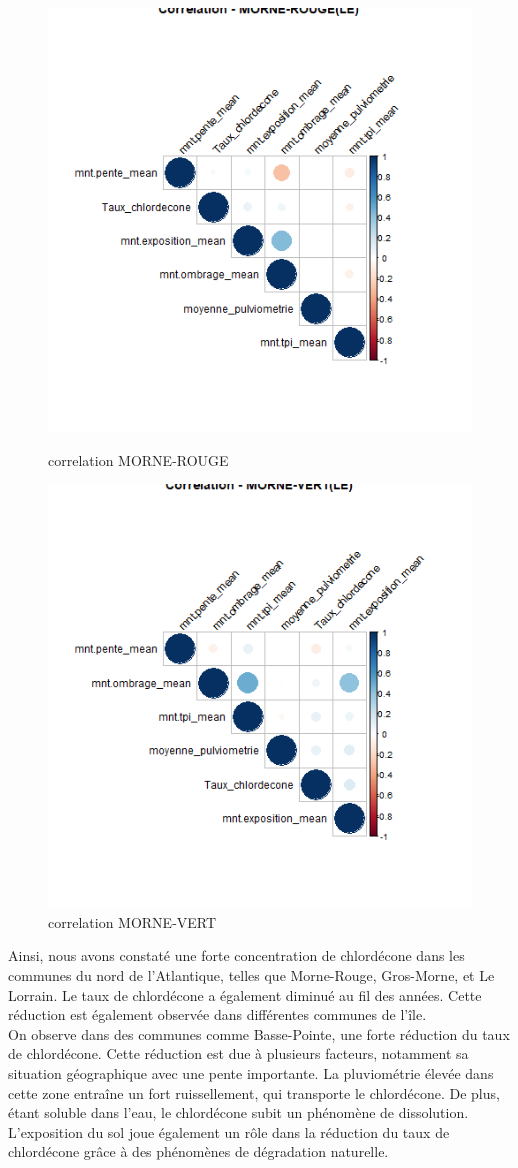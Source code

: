 \documentclass{report}
\begin{document}
\begin{figure}[H]
\begin{minipage}[t]{0.45\linewidth}
\centering
\includegraphics[width =
0.6\linewidth]{correlation_MORNE-ROUGE(LE).png}
\caption{correlation MORNE-ROUGE}
\end{minipage}
\hfill
\begin{minipage}[t]{0.45\linewidth}
\includegraphics[width = 0.6
\linewidth]{correlation_MORNE-VERT(LE).png}
\caption{correlation MORNE-VERT}
\end{minipage}
\end{figure}

Ainsi, nous avons constaté une forte concentration de chlordécone dans les communes du nord de l'Atlantique, telles que Morne-Rouge, Gros-Morne, et Le Lorrain. Le taux de chlordécone a également diminué au fil des années. Cette réduction est également observée dans différentes communes de l'île. \\

On observe dans des communes comme Basse-Pointe, une forte réduction du taux de chlordécone. Cette réduction est due à plusieurs facteurs, notamment sa situation géographique avec une pente importante. La pluviométrie élevée dans cette zone entraîne un fort ruissellement, qui transporte le chlordécone. De plus, étant soluble dans l'eau, le chlordécone subit un phénomène de dissolution. L'exposition du sol joue également un rôle dans la réduction du taux de chlordécone grâce à des phénomènes de dégradation naturelle.\\
\end{document}

